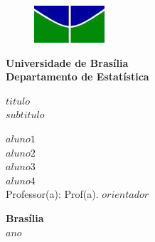 \documentclass[12pt, a4paper, twoside]{article}
\numberwithin{equation}{subsection} %
\newcommand{\titulo}{$titulo$ \\ $subtitulo$}
\newcommand{\autora}{$aluno1$}
\newcommand{\autorb}{$aluno2$}
\newcommand{\autorc}{$aluno3$}
\newcommand{\autord}{$aluno4$}
\newcommand{\orientador}{ Prof(a). $orientador$ }
\begin{document}
\begin{titlepage}
\begin{center}
\begin{figure}[h!]
	\centering
		\includegraphics[scale = 0.8]{img/unb.png}
	\label{fig:unb}
\end{figure}
{\bf Universidade de Brasília \\
\bf Departamento de Estatística}
\vspace{5cm}

\setcounter{page}{0}
\null
\Large
\textbf{\titulo}
\vspace{2.5cm}

\small
\vspace{0.2cm}
\textbf{\autora}\\
\textbf{\autorb}\\
\textbf{\autorc}\\
\textbf{\autord}\\

\vspace{1.5cm}
\small
Professor(a): \orientador \\
\end{center}



\vspace{5cm}

\begin{center}
{\bf{Brasília} \\ }
\bf{$ano$}
\end{center}
\end{titlepage}



\newpage

\setcounter{page}{2}
\onehalfspacing




\setlength{\parindent}{1.5cm}
\setlength{\parskip}{0.2cm}
\setlength{\intextsep}{0.5cm}

\titlespacing*{\section}{0cm}{0cm}{0.5cm}
\titlespacing*{\subsection}{0cm}{0.5cm}{0.5cm}
\titlespacing*{\subsubsection}{0cm}{0.5cm}{0.5cm}
\titlespacing*{\paragraph}{0cm}{0.5cm}{0.5cm}
\end{document}

